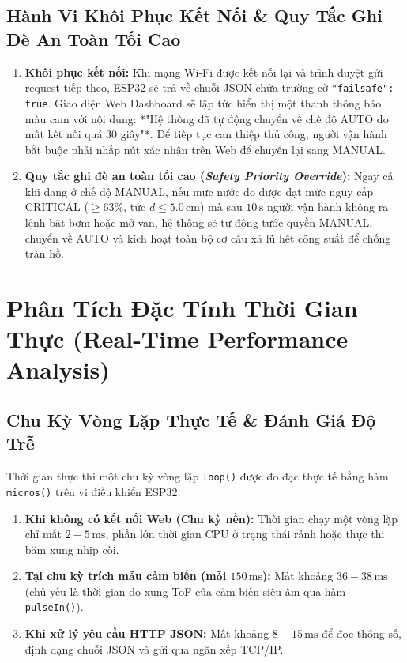 \subsection{Hành Vi Khôi Phục Kết Nối \& Quy Tắc Ghi Đè An Toàn Tối Cao}
\begin{enumerate}
    \item \textbf{Khôi phục kết nối:} Khi mạng Wi-Fi được kết nối lại và trình duyệt gửi request tiếp theo, ESP32 sẽ trả về chuỗi JSON chứa trường cờ \texttt{"failsafe": true}. Giao diện Web Dashboard sẽ lập tức hiển thị một thanh thông báo màu cam với nội dung: *"Hệ thống đã tự động chuyển về chế độ AUTO do mất kết nối quá 30 giây"*. Để tiếp tục can thiệp thủ công, người vận hành bắt buộc phải nhấp nút xác nhận trên Web để chuyển lại sang MANUAL.
    \item \textbf{Quy tắc ghi đè an toàn tối cao (\textit{Safety Priority Override}):} Ngay cả khi đang ở chế độ MANUAL, nếu mực nước đo được đạt mức nguy cấp CRITICAL ($\ge 63\%$, tức $d \le 5.0\,\text{cm}$) mà sau $10\,\text{s}$ người vận hành không ra lệnh bật bơm hoặc mở van, hệ thống sẽ tự động tước quyền MANUAL, chuyển về AUTO và kích hoạt toàn bộ cơ cấu xả lũ hết công suất để chống tràn hồ.

\end{enumerate}

\section{Phân Tích Đặc Tính Thời Gian Thực (Real-Time Performance Analysis)}

\subsection{Chu Kỳ Vòng Lặp Thực Tế \& Đánh Giá Độ Trễ}
Thời gian thực thi một chu kỳ vòng lặp \texttt{loop()} được đo đạc thực tế bằng hàm \texttt{micros()} trên vi điều khiển ESP32:
\begin{enumerate}
    \item \textbf{Khi không có kết nối Web (Chu kỳ nền):} Thời gian chạy một vòng lặp chỉ mất $2 - 5\,\text{ms}$, phần lớn thời gian CPU ở trạng thái rảnh hoặc thực thi băm xung nhịp còi.
    \item \textbf{Tại chu kỳ trích mẫu cảm biến (mỗi $150\,\text{ms}$):} Mất khoảng $36 - 38\,\text{ms}$ (chủ yếu là thời gian đo xung ToF của cảm biến siêu âm qua hàm \texttt{pulseIn()}).
    \item \textbf{Khi xử lý yêu cầu HTTP JSON:} Mất khoảng $8 - 15\,\text{ms}$ để đọc thông số, định dạng chuỗi JSON và gửi qua ngăn xếp TCP/IP.
\end{enumerate}

